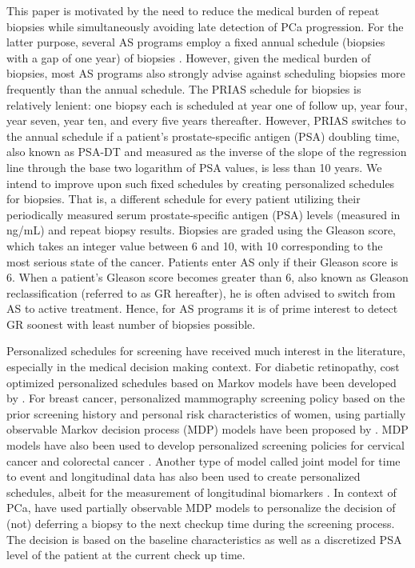 This paper is motivated by the need to reduce the medical burden of repeat biopsies while simultaneously avoiding late detection of PCa progression. For the latter purpose, several AS programs employ a fixed annual schedule (biopsies with a gap of one year) of biopsies \citep{tosoian2011active,welty2015extended}. However, given the medical burden of biopsies, most AS programs also strongly advise against scheduling biopsies more frequently than the annual schedule. The PRIAS schedule for biopsies is relatively lenient: one biopsy each is scheduled at year one of follow up, year four, year seven, year ten, and every five years thereafter. However, PRIAS switches to the annual schedule if a patient's prostate-specific antigen (PSA) doubling time, also known as PSA-DT and measured as the inverse of the slope of the regression line through the base two logarithm of PSA values, is less than 10 years. We intend to improve upon such fixed schedules by creating personalized schedules for biopsies. That is, a different schedule for every patient utilizing their periodically measured serum prostate-specific antigen (PSA) levels (measured in ng/mL) and repeat biopsy results. Biopsies are graded using the Gleason score, which takes an integer value between 6 and 10, with 10 corresponding to the most serious state of the cancer. Patients enter AS only if their Gleason score is 6. When a patient's Gleason score becomes greater than 6, also known as Gleason reclassification (referred to as GR hereafter), he is often advised to switch from AS to active treatment. Hence, for AS programs it is of prime interest to detect GR soonest with least number of biopsies possible.

Personalized schedules for screening have received much interest in the literature, especially in the medical decision making context. For diabetic retinopathy, cost optimized personalized schedules based on Markov models have been developed by \citet{bebu2017OptimalScreening}. For breast cancer, personalized mammography screening policy based on the prior screening history and personal risk characteristics of women, using partially observable Markov decision process (MDP) models have been proposed by \citet*{ayer2012or}. MDP models have also been used to develop personalized screening policies for cervical cancer \citep*{akhavan2017markov} and colorectal cancer \citep*{erenay2014optimizing}. Another type of model called joint model for time to event and longitudinal data \citep{tsiatis2004joint,rizopoulos2012joint} has also been used to create personalized schedules, albeit for the measurement of longitudinal biomarkers \citep{drizopoulosPersScreening}. In context of PCa, \citet{zhang2012optimization} have used partially observable MDP models to personalize the decision of (not) deferring a biopsy to the next checkup time during the screening process. The decision is based on the baseline characteristics as well as a discretized PSA level of the patient at the current check up time.

